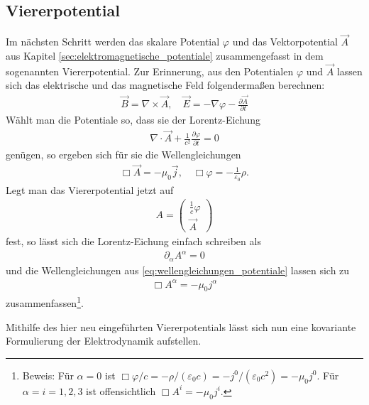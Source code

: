 \subsection{Viererpotential}

Im nächsten Schritt werden das skalare Potential $\varphi$ und das Vektorpotential $\vec A$ aus Kapitel \ref{sec:elektromagnetische_potentiale} zusammengefasst in dem sogenannten Viererpotential.
Zur Erinnerung, aus den Potentialen $\varphi$ und $\vec A$ lassen sich das elektrische und das magnetische Feld folgendermaßen berechnen:
\begin{align*}
    \vec B = \nabla\times \vec A, \quad \vec E=-\nabla\varphi-\frac{\partial\vec A}{\partial t}
\end{align*}
Wählt man die Potentiale so, dass sie der Lorentz-Eichung
\begin{align*}
    \nabla\cdot\vec A +\frac{1}{c^2}\frac{\partial\varphi}{\partial t}=0
\end{align*}
genügen, so ergeben sich für sie die Wellengleichungen
\begin{align}
    \label{eq:wellengleichungen_potentiale}
    \Box\vec A=-\mu_0\vec j, \quad \Box \varphi=-\frac{1}{\varepsilon_0}\rho.
\end{align}
Legt man das Viererpotential jetzt auf
\begin{align*}
    \boxed{A= \begin{pmatrix}
                      \frac{1}{c}\varphi \\
                      \vec A
                  \end{pmatrix}
    }
\end{align*}
fest, so lässt sich die Lorentz-Eichung einfach schreiben als
\begin{align}
    \label{eq:lorentz_eichung_kovariant}
    \boxed{\partial_\alpha A^\alpha=0}
\end{align}
und die Wellengleichungen aus \eqref{eq:wellengleichungen_potentiale} lassen sich zu
\begin{align}
    \label{eq:wellengleichungen_potential_kovariant}
    \boxed{\Box A^\alpha=-\mu_0 j^\alpha}
\end{align}
zusammenfassen\footnote{Beweis: Für $\alpha=0$ ist $\Box\varphi/c=-\rho/(\varepsilon_0c)=-j^0/(\varepsilon_0c^2)=-\mu_0j^0$. Für $\alpha=i=1,2,3$ ist offensichtlich $\Box A^i=-\mu_0 j^i$. }.

Mithilfe des hier neu eingeführten Viererpotentials lässt sich nun eine kovariante Formulierung der Elektrodynamik aufstellen.



